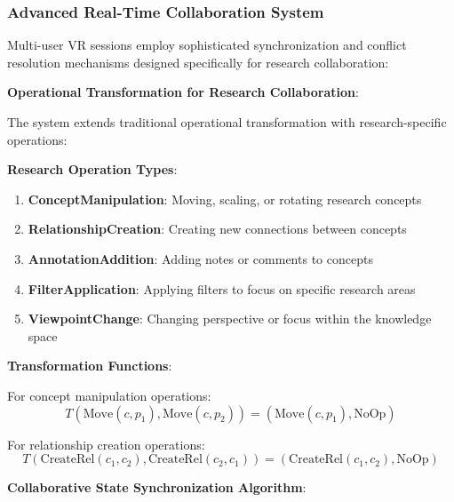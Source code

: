\documentclass[10pt,twocolumn]{article}
\begin{document}
\subsubsection{Advanced Real-Time Collaboration System}

Multi-user VR sessions employ sophisticated synchronization and conflict resolution mechanisms designed specifically for research collaboration:

\textbf{Operational Transformation for Research Collaboration}:

The system extends traditional operational transformation \cite{ellis1989concurrency} with research-specific operations:

\textbf{Research Operation Types}:
\begin{enumerate}
    \item \textbf{ConceptManipulation}: Moving, scaling, or rotating research concepts
    \item \textbf{RelationshipCreation}: Creating new connections between concepts
    \item \textbf{AnnotationAddition}: Adding notes or comments to concepts
    \item \textbf{FilterApplication}: Applying filters to focus on specific research areas
    \item \textbf{ViewpointChange}: Changing perspective or focus within the knowledge space
\end{enumerate}

\textbf{Transformation Functions}:

For concept manipulation operations:
\begin{equation}
T(\text{Move}(c, p_1), \text{Move}(c, p_2)) = (\text{Move}(c, p_1), \text{NoOp})
\end{equation}

For relationship creation operations:
\begin{equation}
T(\text{CreateRel}(c_1, c_2), \text{CreateRel}(c_2, c_1)) = (\text{CreateRel}(c_1, c_2), \text{NoOp})
\end{equation}

\textbf{Collaborative State Synchronization Algorithm}:
\end{document}
